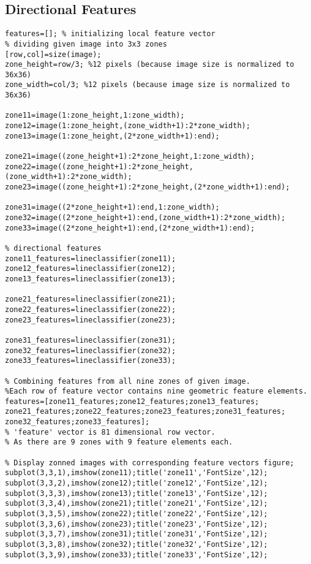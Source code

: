 \subsection*{Directional Features}
\begin{lstlisting}
features=[]; % initializing local feature vector
% dividing given image into 3x3 zones
[row,col]=size(image);
zone_height=row/3; %12 pixels (because image size is normalized to 36x36)
zone_width=col/3; %12 pixels (because image size is normalized to 36x36)

zone11=image(1:zone_height,1:zone_width);
zone12=image(1:zone_height,(zone_width+1):2*zone_width);
zone13=image(1:zone_height,(2*zone_width+1):end);

zone21=image((zone_height+1):2*zone_height,1:zone_width);
zone22=image((zone_height+1):2*zone_height,(zone_width+1):2*zone_width);
zone23=image((zone_height+1):2*zone_height,(2*zone_width+1):end);

zone31=image((2*zone_height+1):end,1:zone_width);
zone32=image((2*zone_height+1):end,(zone_width+1):2*zone_width);
zone33=image((2*zone_height+1):end,(2*zone_width+1):end);

% directional features
zone11_features=lineclassifier(zone11);
zone12_features=lineclassifier(zone12);
zone13_features=lineclassifier(zone13);

zone21_features=lineclassifier(zone21);
zone22_features=lineclassifier(zone22);
zone23_features=lineclassifier(zone23);

zone31_features=lineclassifier(zone31);
zone32_features=lineclassifier(zone32);
zone33_features=lineclassifier(zone33);

% Combining features from all nine zones of given image.
%Each row of feature vector contains nine geometric feature elements.
features=[zone11_features;zone12_features;zone13_features;
zone21_features;zone22_features;zone23_features;zone31_features;
zone32_features;zone33_features];
% 'feature' vector is 81 dimensional row vector. 
% As there are 9 zones with 9 feature elements each.

% Display zonned images with corresponding feature vectors figure;
subplot(3,3,1),imshow(zone11);title('zone11','FontSize',12);
subplot(3,3,2),imshow(zone12);title('zone12','FontSize',12);
subplot(3,3,3),imshow(zone13);title('zone13','FontSize',12);
subplot(3,3,4),imshow(zone21);title('zone21','FontSize',12);
subplot(3,3,5),imshow(zone22);title('zone22','FontSize',12);
subplot(3,3,6),imshow(zone23);title('zone23','FontSize',12);
subplot(3,3,7),imshow(zone31);title('zone31','FontSize',12);
subplot(3,3,8),imshow(zone32);title('zone32','FontSize',12);
subplot(3,3,9),imshow(zone33);title('zone33','FontSize',12);
\end{lstlisting}

